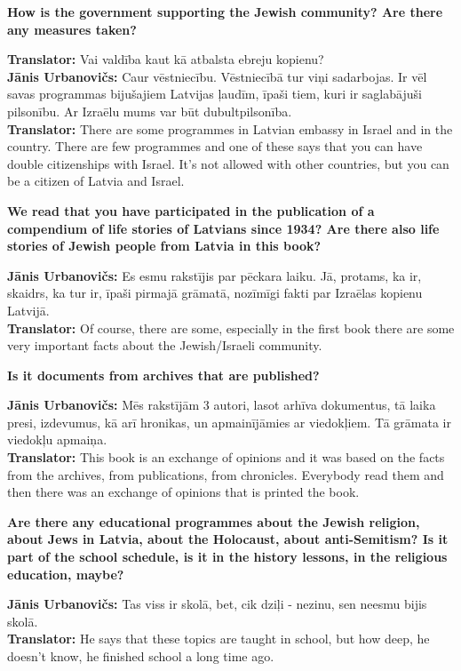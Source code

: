 \textbf{How is the government supporting the Jewish community? Are there any measures taken?} 

\textbf{Translator:} Vai valdība kaut kā atbalsta ebreju kopienu?\\
\textbf{Jānis Urbanovičs:} Caur vēstniecību. Vēstniecībā tur viņi sadarbojas. Ir vēl savas programmas bijušajiem Latvijas ļaudīm, īpaši tiem, kuri ir saglabājuši pilsonību. Ar Izraēlu mums var būt dubultpilsonība.\\
\textbf{Translator:} There are some programmes in Latvian embassy in Israel and in the country. There are few programmes and one of these says that you can have double citizenships with Israel. It’s not allowed with other countries, but you can be a citizen of Latvia and Israel.  

\textbf{We read that you have participated in the publication of a compendium of life stories of Latvians since 1934? Are there also life stories of Jewish people from Latvia in this book?} 

\textbf{Jānis Urbanovičs:} Es esmu rakstījis par pēckara laiku. Jā, protams, ka ir, skaidrs, ka tur ir, īpaši pirmajā grāmatā, nozīmīgi fakti par Izraēlas kopienu Latvijā.\\  
\textbf{Translator:} Of course, there are some, especially in the first book there are some very important facts about the Jewish/Israeli community.  

\textbf{Is it documents from archives that are published?}  

\textbf{Jānis Urbanovičs:} Mēs rakstījām 3 autori, lasot arhīva dokumentus, tā laika presi, izdevumus, kā arī hronikas, un apmainījāmies ar viedokļiem. Tā grāmata ir viedokļu apmaiņa.\\  
\textbf{Translator:} This book is an exchange of opinions and it was based on the facts from the archives, from publications, from chronicles. Everybody read them and then there was an exchange of opinions that is printed the book. 

\textbf{Are there any educational programmes about the Jewish religion, about Jews in Latvia, about the Holocaust, about anti-Semitism? Is it part of the school schedule, is it in the history lessons, in the religious education, maybe?}  

\textbf{Jānis Urbanovičs:} Tas viss ir skolā, bet, cik dziļi - nezinu, sen neesmu bijis skolā.\\  
\textbf{Translator:} He says that these topics are taught in school, but how deep, he doesn't know, he finished school a long time ago. 

